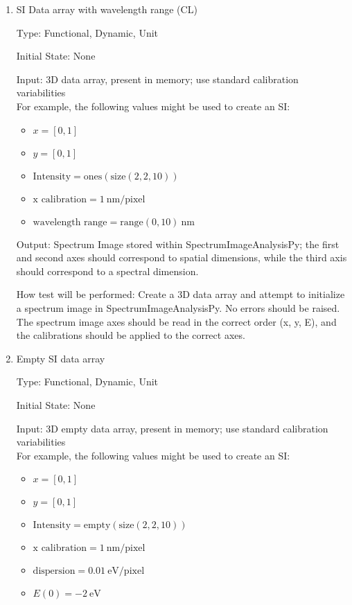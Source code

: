 \documentclass[12pt, titlepage]{article}
\newcommand{\progname}{SpectrumImageAnalysisPy}
\begin{document}
\begin{enumerate}
Output: Spectrum Image stored within \progname{}; the first and second axes
should correspond to spatial dimensions, while the third axis should correspond
to a spectral dimension.

How test will be performed: Create a 3D data array and attempt to initialize a
spectrum image in \progname{}. No errors should be raised. The spectrum image
axes should be read in the correct order (x, y, E), and the calibrations should
be applied to the correct axes.


\item{SI Data array with wavelength range (CL)}

Type: Functional, Dynamic, Unit

Initial State: None

Input: 3D data array, present in memory; use standard calibration
variabilities\\
For example, the following values might be used to create an SI: 
\begin{itemize}
	\item $x = [0, 1]$
	\item $y = [0, 1]$
	\item $\text{Intensity} = \text{ones}(\text{size}(2,2,10))$
	\item $\text{x calibration} = 1\ \si{\nano\metre}/\text{pixel}$
	\item $\text{wavelength range} = \text{range}(0, 10)\ \si{\nano\metre}$
\end{itemize}

Output: Spectrum Image stored within \progname{}; the first and second axes
should correspond to spatial dimensions, while the third axis should correspond
to a spectral dimension.

How test will be performed: Create a 3D data array and attempt to initialize a
spectrum image in \progname{}. No errors should be raised. The spectrum image
axes should be read in the correct order (x, y, E), and the calibrations should
be applied to the correct axes.

\item{Empty SI data array}

Type: Functional, Dynamic, Unit

Initial State: None

Input: 3D empty data array, present in memory; use standard calibration
variabilities\\
For example, the following values might be used to create an SI: 
\begin{itemize}
    \item $x = [0, 1]$
    \item $y = [0, 1]$
    \item $\text{Intensity} = \text{empty}(\text{size}(2,2,10))$
    \item $\text{x calibration} = 1\ \si{\nano\metre}/\text{pixel}$
    \item $\text{dispersion} = 0.01\ \si{\electronvolt}/\text{pixel}$
    \item $E(0) = -2\ \si{\electronvolt}$
\end{itemize}


\end{enumerate}
\end{document}
